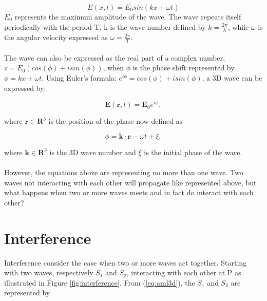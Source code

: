 \begin{equation}
    E(x,t) = E_0 sin(kx+\omega t)
    \label{eq:aml2d}
\end{equation}
$E_0$ represents the maximum amplitude of the wave. The wave repeats itself periodically with the period T. k is the wave number defined by $k= \frac{2 \pi}{\lambda}$, while $\omega$ is the angular velocity expressed as $\omega = \frac{2 \pi}{T}$.
\\\\
The wave can also be expressed as the real part of a complex number, $z = E_0(cos(\phi) + i sin(\phi))$, when $\phi$ is the phase shift represented by $\phi = kx + \omega t$. Using Euler's formula: $e^{i \phi} = cos(\phi) + i sin(\phi)$, a 3D wave can be expressed by: 

\begin{equation}
    \textbf{E}(\textbf{r},t) = \textbf{E}_0 e^{i \phi},
    \label{eq:aml3d}
\end{equation}

where $\textbf{r} \in \textbf{R}^3$ is the position of the phase now defined as 

\begin{equation}
    \phi = \textbf{k}\cdot \textbf{r} - \omega t + \xi,
    \label{eq:phase}
\end{equation}

where $\textbf{k} \in \textbf{R}^3$ is the 3D wave number and $\xi$ is the initial phase of the wave. 
\\\\
However, the equations above are representing no more than one wave. Two waves not interacting with each other will propagate like represented above, but what happens when two or more waves meets and in fact do interact with each other? 

\section{Interference} \label{sec:interference}
Interference consider the case when two or more waves act together. Starting with two waves, respectively $S_1$ and $S_2$, interacting with each other at P as illustrated in Figure \ref{fig:interference}. From (\ref{eq:aml3d}), the $S_1$ and $S_2$ are represented by

